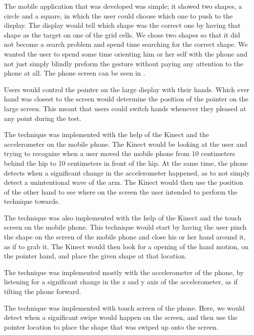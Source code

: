 The mobile application that was developed was simple; it showed two shapes, a circle and a square, in which the user could choose which one to push to the display. The display would tell which shape was the correct one by having that shape as the target on one of the grid cells. We chose two shapes so that it did not become a search problem and spend time searching for the correct shape. We wanted the user to spend some time orienting him or her self with the phone and not just simply blindly preform the gesture without paying any attention to the phone at all. The phone screen can be seen in .

Users would control the pointer on the large display with their hands. 
Which ever hand was closest to the screen would determine the position of the pointer on the large screen. 
This meant that users could switch hands whenever they pleased at any point during the test. 

The \throw technique was implemented with the help of the Kinect and the accelerometer on the mobile phone. 
The Kinect would be looking at the user and trying to recognize when a user moved the mobile phone from 10 centimeters behind the hip to 10 centimeters in front of the hip. 
At the same time, the phone detects when a significant change in the accelerometer happened, as to not simply detect a unintentional wave of the arm. 
The Kinect would then use the position of the other hand to see where on the screen the user intended to perform the \throw technique towards. 

The \pinch technique was also implemented with the help of the Kinect and the touch screen on the mobile phone. 
This technique would start by having the user pinch the shape on the screen of the mobile phone and close his or her hand around it, as if to grab it. 
The Kinect would then look for a opening of the hand motion, on the pointer hand, and place the given shape at that location. 

The \tilt technique was implemented mostly with the accelerometer of the phone, by listening for a significant change in the z and y axis of the accelerometer, as if tilting the phone forward. 

The \swipe technique was implemented with touch screen of the phone. 
Here, we would detect when a significant swipe would happen on the screen, and then use the pointer location to place the shape that was swiped up onto the screen. 

